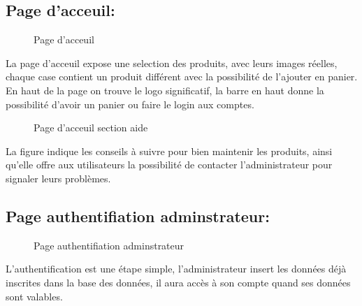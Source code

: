 \documentclass[a4paper]{report}
\begin{document}
\begin{doublespace}
\begin{doublespace}
\begin{doublespace}
\begin{doublespace}
\begin{doublespace}
                    \subsection{Page d'acceuil:}
                    \begin{figure}[H]
                        \begin{center}
                            \caption{Page d'acceuil}
                        \end{center}
                    \end{figure}
                    \newpage
                    La page d'acceuil expose une selection des produits,
                    avec leurs images réelles, chaque case contient un produit différent avec la
                    possibilité de l'ajouter en panier. En haut de la page on trouve le logo
                    significatif, la barre en haut donne la possibilité d'avoir un panier ou faire
                    le login aux comptes.
                    \begin{figure}[H]
                        \begin{center}
                            \caption{Page d'acceuil section aide }
                        \end{center}
                    \end{figure}
                    La figure indique les conseils à suivre pour bien
                    maintenir les produits, ainsi qu'elle offre aux utilisateurs la possibilité de
                    contacter l'administrateur pour signaler leurs problèmes.
                    \subsection{Page authentifiation adminstrateur:}
                    \begin{figure}[H]
                        \begin{center}
                            \caption{Page authentifiation adminstrateur}
                        \end{center}
                    \end{figure}
                    L’authentification est une étape simple,
                    l'administrateur insert les données déjà inscrites dans la base des données, il
                    aura accès à son compte quand ses données sont valables.

\end{doublespace}
\end{doublespace}
\end{doublespace}
\end{doublespace}
\end{doublespace}
\end{document}

